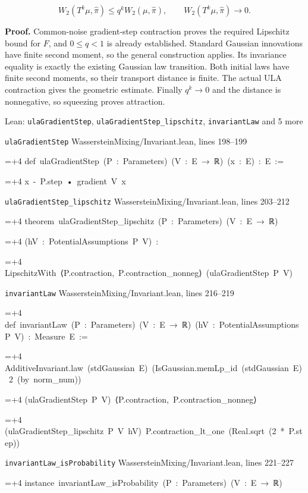 \documentclass[11pt,a4paper]{report}
\newlength{\leancharwidth}
\newenvironment{leancode}{\par\smallskip\begingroup\ttfamily\footnotesize\raggedright
  \settowidth{\leancharwidth}{M}\setlength{\parskip}{0pt}\setlength{\parindent}{0pt}
  \frenchspacing}{\par\endgroup\smallskip}
\newcommand{\leanline}[2]{\hangindent=\dimexpr#1\leancharwidth+4\leancharwidth\relax
  \hangafter=1\noindent\hspace*{#1\leancharwidth}#2\par}
\newcommand{\leansource}[1]{\par{\footnotesize\color{leanmuted}#1}\par}
\begin{document}
\[W_2(T^k\mu,\widehat\pi)\le q^kW_2(\mu,\widehat\pi),
\qquad W_2(T^k\mu,\widehat\pi)\longrightarrow0.\]


\textbf{Proof.} Common-noise gradient-step contraction proves the required Lipschitz bound for \(F\), and \(0\le q<1\) is already established. Standard Gaussian innovations have finite second moment, so the general construction applies. Its invariance equality is exactly the existing Gaussian law transition. Both initial laws have finite second moments, so their transport distance is finite. The actual ULA contraction gives the geometric estimate. Finally \(q^k\to0\) and the distance is nonnegative, so squeezing proves attraction.

\begin{leanbox}{Lean: \texttt{ulaGradientStep}, \texttt{ulaGradientStep\_\allowbreak{}lipschitz}, \texttt{invariantLaw} and 5 more}
\leansource{\texttt{ulaGradientStep} \quad WassersteinMixing/\allowbreak{}Invariant.lean, lines 198–199}
\begin{leancode}
\leanline{0}{def\ ulaGradientStep\ (P\ :\ Parameters)\ (V\ :\ E\ →\ ℝ)\ (x\ :\ E)\ :\ E\ :=}
\leanline{2}{x\ -\ P.step\ •\ gradient\ V\ x}
\end{leancode}
\leansource{\texttt{ulaGradientStep\_\allowbreak{}lipschitz} \quad WassersteinMixing/\allowbreak{}Invariant.lean, lines 203–212}
\begin{leancode}
\leanline{0}{theorem\ ulaGradientStep\_lipschitz\ (P\ :\ Parameters)\ (V\ :\ E\ →\ ℝ)}
\leanline{4}{(hV\ :\ PotentialAssumptions\ P\ V)\ :}
\leanline{4}{LipschitzWith\ ⟨P.contraction,\ P.contraction\_nonneg⟩\ (ulaGradientStep\ P\ V)}
\end{leancode}
\leansource{\texttt{invariantLaw} \quad WassersteinMixing/\allowbreak{}Invariant.lean, lines 216–219}
\begin{leancode}
\leanline{0}{def\ invariantLaw\ (P\ :\ Parameters)\ (V\ :\ E\ →\ ℝ)\ (hV\ :\ PotentialAssumptions\ P\ V)\ :\ Measure\ E\ :=}
\leanline{2}{AdditiveInvariant.law\ (stdGaussian\ E)\ (IsGaussian.memLp\_id\ (stdGaussian\ E)\ 2\ (by\ norm\_num))}
\leanline{4}{(ulaGradientStep\ P\ V)\ ⟨P.contraction,\ P.contraction\_nonneg⟩}
\leanline{4}{(ulaGradientStep\_lipschitz\ P\ V\ hV)\ P.contraction\_lt\_one\ (Real.sqrt\ (2\ *\ P.step))}
\end{leancode}
\leansource{\texttt{invariantLaw\_\allowbreak{}isProbability} \quad WassersteinMixing/\allowbreak{}Invariant.lean, lines 221–227}
\begin{leancode}
\leanline{0}{instance\ invariantLaw\_isProbability\ (P\ :\ Parameters)\ (V\ :\ E\ →\ ℝ)}

\end{leancode}
\end{leanbox}
\end{document}
